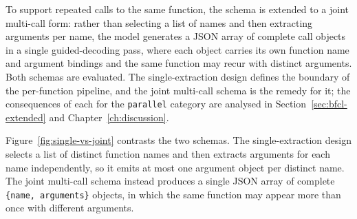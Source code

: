 To support repeated calls to the same function, the schema is extended
to a joint multi-call form: rather than selecting a list of names and
then extracting arguments per name, the model generates a JSON array of
complete call objects in a single guided-decoding pass, where each
object carries its own function name and argument bindings and the same
function may recur with distinct arguments. Both schemas are evaluated.
The single-extraction design defines the boundary of the per-function
pipeline, and the joint multi-call schema is the remedy for it; the
consequences of each for the \texttt{parallel} category
are analysed in Section~\ref{sec:bfcl-extended} and
Chapter~\ref{ch:discussion}.

Figure~\ref{fig:single-vs-joint} contrasts the two schemas. The
single-extraction design selects a list of distinct function names and
then extracts arguments for each name independently, so it emits at most
one argument object per distinct name. The joint multi-call schema instead
produces a single JSON array of complete \texttt{\{name, arguments\}}
objects, in which the same function may appear more than once with different
arguments.

